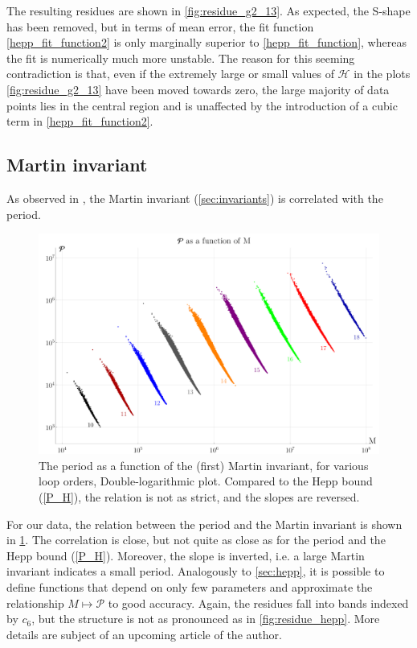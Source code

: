 \documentclass[12pt,a4paper]{article}
\newcommand{\period}{\mathcal P}
\renewcommand{\|}{\rule[-0.4ex]{0.2ex}{1.2em}}
\begin{document}
The resulting residues are shown in \cref{fig:residue_g2_13}. As expected, the S-shape has been removed, but in terms of mean error, the fit function \cref{hepp_fit_function2} is only marginally superior to \cref{hepp_fit_function}, whereas the fit is numerically much more unstable. The reason for this seeming contradiction is that, even if the extremely large or small values of $\mathcal H$ in the plots \cref{fig:residue_g2_13} have been moved towards zero, the large majority of data points lies in the central region and is unaffected by the introduction of a cubic term in \cref{hepp_fit_function2}.



\subsection{Martin invariant}\label{sec:martin}

As observed in \cite{panzer_feynman_2023}, the  Martin invariant (\cref{sec:invariants}) is correlated with the period.

\begin{figure}[h]
	\centering
	\includegraphics[width=.85\linewidth]{P_M}
	\caption{The period as a function of the (first) Martin invariant, for various loop orders, Double-logarithmic plot.  Compared to the Hepp bound  (\cref{P_H}), the relation is not as strict, and the slopes are reversed.  }
	\label{P_M}
\end{figure}

For our data, the relation between the period and the Martin invariant is shown in \cref{P_M}. 
The correlation is close, but not quite as close as for the period and the Hepp bound (\cref{P_H}). Moreover, the slope is inverted, i.e. a large Martin invariant indicates a small period. Analogously to \cref{sec:hepp}, it is possible to define functions that depend on only few parameters and approximate the relationship $M \mapsto \period$ to good accuracy. Again, the residues fall into bands indexed by $c_6$, but the structure is not as pronounced as in \cref{fig:residue_hepp}. More details are subject of an upcoming article of the author. 
\end{document}
